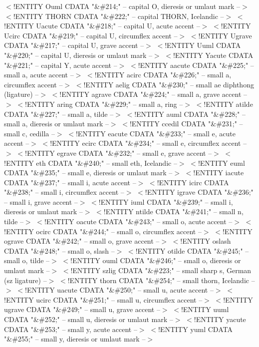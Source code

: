 $<$!ENTITY Ouml   CDATA "\&\#214;" -- capital O, dieresis or umlaut mark --$>$
$<$!ENTITY THORN  CDATA "\&\#222;" -- capital THORN, Icelandic --$>$
$<$!ENTITY Uacute CDATA "\&\#218;" -- capital U, acute accent --$>$
$<$!ENTITY Ucirc  CDATA "\&\#219;" -- capital U, circumflex accent --$>$
$<$!ENTITY Ugrave CDATA "\&\#217;" -- capital U, grave accent --$>$
$<$!ENTITY Uuml   CDATA "\&\#220;" -- capital U, dieresis or umlaut mark --$>$
$<$!ENTITY Yacute CDATA "\&\#221;" -- capital Y, acute accent --$>$
$<$!ENTITY aacute CDATA "\&\#225;" -- small a, acute accent --$>$
$<$!ENTITY acirc  CDATA "\&\#226;" -- small a, circumflex accent --$>$
$<$!ENTITY aelig  CDATA "\&\#230;" -- small ae diphthong (ligature) --$>$
$<$!ENTITY agrave CDATA "\&\#224;" -- small a, grave accent --$>$
$<$!ENTITY aring  CDATA "\&\#229;" -- small a, ring --$>$
$<$!ENTITY atilde CDATA "\&\#227;" -- small a, tilde --$>$
$<$!ENTITY auml   CDATA "\&\#228;" -- small a, dieresis or umlaut mark --$>$
$<$!ENTITY ccedil CDATA "\&\#231;" -- small c, cedilla --$>$
$<$!ENTITY eacute CDATA "\&\#233;" -- small e, acute accent --$>$
$<$!ENTITY ecirc  CDATA "\&\#234;" -- small e, circumflex accent --$>$
$<$!ENTITY egrave CDATA "\&\#232;" -- small e, grave accent --$>$
$<$!ENTITY eth    CDATA "\&\#240;" -- small eth, Icelandic --$>$
$<$!ENTITY euml   CDATA "\&\#235;" -- small e, dieresis or umlaut mark --$>$
$<$!ENTITY iacute CDATA "\&\#237;" -- small i, acute accent --$>$
$<$!ENTITY icirc  CDATA "\&\#238;" -- small i, circumflex accent --$>$
$<$!ENTITY igrave CDATA "\&\#236;" -- small i, grave accent --$>$
$<$!ENTITY iuml   CDATA "\&\#239;" -- small i, dieresis or umlaut mark --$>$
$<$!ENTITY ntilde CDATA "\&\#241;" -- small n, tilde --$>$
$<$!ENTITY oacute CDATA "\&\#243;" -- small o, acute accent --$>$
$<$!ENTITY ocirc  CDATA "\&\#244;" -- small o, circumflex accent --$>$
$<$!ENTITY ograve CDATA "\&\#242;" -- small o, grave accent --$>$
$<$!ENTITY oslash CDATA "\&\#248;" -- small o, slash --$>$
$<$!ENTITY otilde CDATA "\&\#245;" -- small o, tilde --$>$
$<$!ENTITY ouml   CDATA "\&\#246;" -- small o, dieresis or umlaut mark --$>$
$<$!ENTITY szlig  CDATA "\&\#223;" -- small sharp s, German (sz ligature) --$>$
$<$!ENTITY thorn  CDATA "\&\#254;" -- small thorn, Icelandic --$>$
$<$!ENTITY uacute CDATA "\&\#250;" -- small u, acute accent --$>$
$<$!ENTITY ucirc  CDATA "\&\#251;" -- small u, circumflex accent --$>$
$<$!ENTITY ugrave CDATA "\&\#249;" -- small u, grave accent --$>$
$<$!ENTITY uuml   CDATA "\&\#252;" -- small u, dieresis or umlaut mark --$>$
$<$!ENTITY yacute CDATA "\&\#253;" -- small y, acute accent --$>$
$<$!ENTITY yuml   CDATA "\&\#255;" -- small y, dieresis or umlaut mark --$>$
